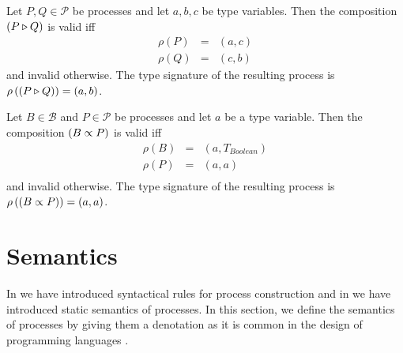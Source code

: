 \begin{definition}
\label{def:static_sequence}
Let $P, Q \in \mathcal{P}$ be processes and let $a, b, c$ be type variables. Then the composition $\left( P \triangleright Q \right)$ is valid iff
\begin{eqnarray*}
  \rho \left( P \right) & = & \left( a, c \right) \\
  \rho \left( Q \right) & = & \left( c, b \right)
\end{eqnarray*}
and invalid otherwise. The type signature of the resulting process is $\rho \left( \left( P \triangleright Q \right) \right) = \left( a, b \right)$.

\hfill\qedsymbol
\end{definition}


\begin{definition}
\label{def:static_repetition}
Let $B \in \mathcal{B}$ and $P \in \mathcal{P}$ be processes and let $a$ be a type variable. Then the composition $\left( B \propto P \right)$ is valid iff
\begin{eqnarray*}
  \rho \left( B \right) & = & \left( a, T_{Boolean} \right) \\
  \rho \left( P \right) & = & \left( a, a \right) \\
\end{eqnarray*}
and invalid otherwise. The type signature of the resulting process is $\rho \left( \left( B \propto P \right) \right) = \left( a, a \right)$.

\hfill\qedsymbol
\end{definition}




\clearpage
\section{Semantics}
\label{chp:semantics}
In  we have introduced syntactical rules for process construction and in  we have introduced static semantics of processes. In this section, we define the semantics of processes by giving them a denotation as it is common in the design of programming languages \cite{DenSem}.

